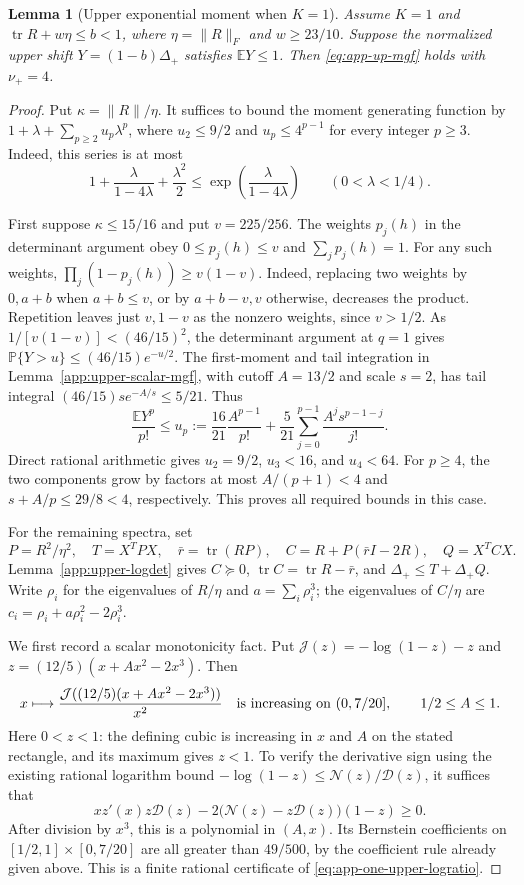 \documentclass[11pt,a4paper]{article}
\numberwithin{equation}{section}
\newtheorem{lemma}[theorem]{Lemma}
\begin{document}
\begin{lemma}[Upper exponential moment when $K=1$]\label{app:one-upper-mgf}
Assume $K=1$ and
$\operatorname{tr}R+w\eta\le b<1$, where $\eta=\|R\|_F$ and $w\ge23/10$.
Suppose the normalized upper shift $Y=(1-b)\Delta_+$ satisfies
$\mathbb EY\le1$. Then \eqref{eq:app-up-mgf} holds with $\nu_+=4$.
\end{lemma}

\begin{proof}
Put $\kappa=\|R\|/\eta$.
It suffices to bound the moment generating function by
$1+\lambda+\sum_{p\ge2}u_p\lambda^p$, where
$u_2\le9/2$ and $u_p\le4^{p-1}$ for every integer $p\ge3$.
Indeed, this series is at most
\[
 1+\frac{\lambda}{1-4\lambda}+\frac{\lambda^2}{2}
 \le\exp\left(\frac{\lambda}{1-4\lambda}\right)
 \qquad(0<\lambda<1/4).
\]

First suppose $\kappa\le15/16$ and put $v=225/256$.
The weights $p_j(h)$ in the determinant argument obey
$0\le p_j(h)\le v$ and $\sum_jp_j(h)=1$.
For any such weights, $\prod_j(1-p_j(h))\ge v(1-v)$.
Indeed, replacing two weights by $0,a+b$ when $a+b\le v$, or by
$a+b-v,v$ otherwise, decreases the product. Repetition leaves just
$v,1-v$ as the nonzero weights, since $v>1/2$.
As $1/[v(1-v)]<(46/15)^2$, the determinant argument at $q=1$ gives
$\mathbb P\{Y>u\}\le(46/15)e^{-u/2}$.
The first-moment and tail integration in
Lemma~\ref{app:upper-scalar-mgf}, with cutoff $A=13/2$ and scale $s=2$,
has tail integral $(46/15)s e^{-A/s}\le5/21$.
Thus
\[
 \frac{\mathbb EY^p}{p!}\le u_p
 :=\frac{16}{21}\frac{A^{p-1}}{p!}
 +\frac5{21}\sum_{j=0}^{p-1}\frac{A^j s^{p-1-j}}{j!}.
\]
Direct rational arithmetic gives $u_2=9/2$, $u_3<16$, and $u_4<64$.
For $p\ge4$, the two components grow by factors at most
$A/(p+1)<4$ and $s+A/p\le29/8<4$, respectively.
This proves all required bounds in this case.

For the remaining spectra, set
\[
 P=R^2/\eta^2,\quad T=X^TPX,\quad
 \bar r=\operatorname{tr}(RP),\quad
 C=R+P(\bar rI-2R),\quad Q=X^TCX.
\]
Lemma~\ref{app:upper-logdet} gives $C\succeq0$,
$\operatorname{tr}C=\operatorname{tr}R-\bar r$, and
$\Delta_+\le T+\Delta_+Q$.
Write $\rho_i$ for the eigenvalues of $R/\eta$ and $a=\sum_i\rho_i^3$;
the eigenvalues of $C/\eta$ are $c_i=\rho_i+a\rho_i^2-2\rho_i^3$.

We first record a scalar monotonicity fact. Put
$\mathcal J(z)=-\log(1-z)-z$ and $z=(12/5)(x+Ax^2-2x^3)$.
Then
\begin{equation}\label{eq:app-one-upper-logratio}
 x\longmapsto\frac{\mathcal J((12/5)(x+Ax^2-2x^3))}{x^2}
 \quad\hbox{is increasing on }(0,7/20],\qquad 1/2\le A\le1.
\end{equation}
Here $0<z<1$: the defining cubic is increasing in $x$ and $A$
on the stated rectangle, and its maximum gives $z<1$.
To verify the derivative sign using the existing rational
logarithm bound $-\log(1-z)\le\mathcal N(z)/\mathcal D(z)$, it suffices
that
\[
 xz'(x)z\mathcal D(z)
 -2\bigl(\mathcal N(z)-z\mathcal D(z)\bigr)(1-z)\ge0.
\]
After division by $x^3$, this is a polynomial in $(A,x)$.
Its Bernstein coefficients on $[1/2,1]\times[0,7/20]$ are all greater
than $49/500$, by the coefficient rule already given above.
This is a finite rational certificate of \eqref{eq:app-one-upper-logratio}.


\end{proof}
\end{document}
